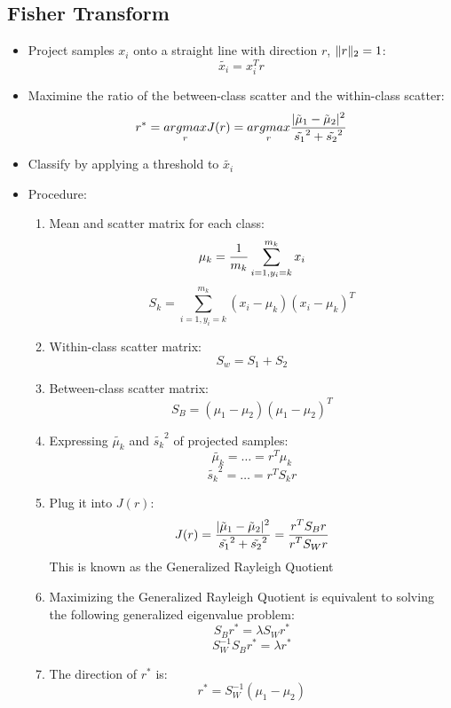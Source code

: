 \subsection*{Fisher Transform}
\begin{itemize}
    \item
        Project samples $x_i$ onto a straight line with direction $r$, $\lVert r\rVert_2 = 1$:
        $$\tilde{x_i} = x_i^T r$$
    \item
        Maximine the ratio of the between-class scatter and the within-class scatter: 
        $$r^* = \underset{r}{argmax} J(r) = \underset{r}{argmax}\frac{\displaystyle | \tilde{\mu}_1 - \tilde{\mu}_2|^2}{\displaystyle \tilde{s_1}^2 + \tilde{s_2}^2}$$
    \item
        Classify by applying a threshold to $\tilde{x_i}$
    \item
        Procedure:
        \begin{enumerate}
            \item
                Mean and scatter matrix for each class:
                $$ \mu_k = \frac{\displaystyle 1}{\displaystyle m_k} \sum_{i=1, y_i = k}^{m_k} x_i$$
                $$ S_k = \sum_{i=1, y_i = k}^{m_k} (x_i - \mu_k) (x_i - \mu_k)^T$$
            \item
                Within-class scatter matrix:
                $$S_w = S_1 + S_2$$
            \item
                Between-class scatter matrix:
                $$S_B = (\mu_1 - \mu_2)(\mu_1 - \mu_2)^T$$
            \item
                Expressing $\tilde{\mu_k}$ and $\tilde{s_k}^2$ of projected samples:
                $$\tilde{\mu_k} = \dots = r^T \mu_k$$
                $$\tilde{s_k}^2 = \dots = r^T S_k r$$
            \item
                Plug it into $J(r)$:
                $$ J(r) = \frac{\displaystyle | \tilde{\mu}_1 - \tilde{\mu}_2|^2}{\displaystyle \tilde{s_1}^2 + \tilde{s_2}^2} = \frac{\displaystyle r^T S_B r}{\displaystyle r^T S_W r}$$
                This is known as the Generalized Rayleigh Quotient
            \item
                Maximizing the Generalized Rayleigh Quotient is equivalent to solving the following generalized eigenvalue problem:
                $$S_B r^* = \lambda S_W r^*$$
                $$ S_W^{-1} S_B r^* = \lambda r^*$$
            \item
                The direction of $r^*$ is:
                $$ r^* = S_W^{-1}(\mu_1 - \mu_2) $$
        \end{enumerate}
\end{itemize}

